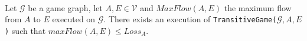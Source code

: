 \begin{lemma} \ \\
   \label{maxflowgame}
   Let $\mathcal{G}$ be a game graph, let $A, E \in \mathcal{V}$ and $MaxFlow\left(A, E\right)$ the maximum flow from
   $A$ to $E$ executed on $\mathcal{G}$. There exists an execution of
   \texttt{TransitiveGame(}$\mathcal{G}, A, E$\texttt{)} such that $maxFlow\left(A, E\right) \leq Loss_A$.
\end{lemma}
